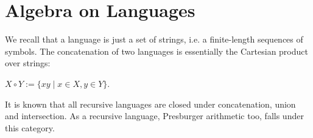 \documentclass[11pt]{article}
\begin{document}
  \newpage

  \section{Algebra on Languages}

We recall that a language is just a set of strings, i.e. a finite-length sequences of symbols. The concatenation of two languages is essentially the Cartesian product over strings:

$X \circ Y := \{xy \mid x \in X, y \in Y\}$.

It is known that all recursive languages are closed under concatenation, union and intersection. As a recursive language, Presburger arithmetic too, falls under this category.
\end{document}

